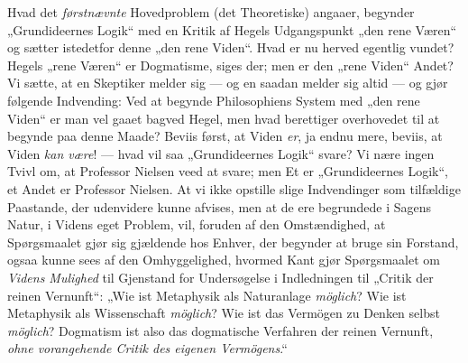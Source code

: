 \documentclass[12pt,a4paper]{book}
\newcommand{\opage}[1]{\marginnote{\footnotesize\textit{[#1]}}}
\begin{document}
Hvad det \emph{førstnævnte} Hovedproblem (det Theoretiske)
angaaer, begynder „Grundideernes Logik“ med en
Kritik af Hegels Udgangspunkt „den rene Væren“ og
sætter istedetfor denne „den rene Viden“. Hvad er nu
herved egentlig vundet? Hegels „rene Væren“ er Dogmatisme,
siges der; men er den „rene Viden“ Andet?
Vi sætte, at en Skeptiker melder sig --- og en saadan
melder sig altid --- og gjør følgende Indvending: Ved
at begynde Philosophiens System med „den rene Viden“
er man vel gaaet bagved Hegel, men hvad berettiger
overhovedet til at begynde paa denne Maade? Beviis
først, at Viden \emph{er}, ja endnu mere, beviis, at Viden
\emph{kan være}! --- hvad vil saa „Grundideernes Logik“
svare? Vi nære ingen Tvivl om, at Professor Nielsen
veed at svare; men Et er „Grundideernes Logik“, et
Andet er Professor Nielsen. At vi ikke opstille slige
Indvendinger som tilfældige Paastande, der udenvidere
kunne afvises, men at de ere begrundede i Sagens
Natur, i Videns eget Problem, vil, foruden af den
Omstændighed, at Spørgsmaalet gjør sig gjældende hos
Enhver, der begynder at bruge sin Forstand, ogsaa kunne
sees af den Omhyggelighed, hvormed Kant gjør Spørgsmaalet
om \emph{Videns Mulighed} til Gjenstand for Undersøgelse
i Indledningen til „Critik der reinen Vernunft“:
„Wie ist Metaphysik als Naturanlage \emph{möglich}?
Wie ist Metaphysik als Wissenschaft \emph{möglich}? Wie ist das
Vermögen zu Denken selbst \emph{möglich}? Dogmatism ist also
\opage{54}\setcounter{footnote}{0}%
das dogmatische Verfahren der reinen Vernunft, \emph{ohne
vorangehende Critik des eigenen Vermögens}.“
\end{document}
